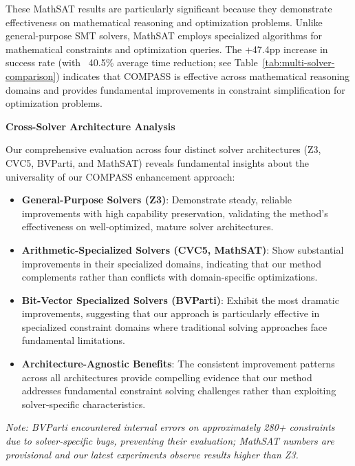 \documentclass[acmsmall,screen,review,anonymous]{acmart}
\newcommand{\tool}{\textsf{COMPASS}\xspace}
\begin{document}
These MathSAT results are particularly significant because they demonstrate effectiveness on mathematical reasoning and optimization problems. Unlike general-purpose SMT solvers, MathSAT employs specialized algorithms for mathematical constraints and optimization queries. The +47.4pp increase in success rate (with ~40.5\% average time reduction; see Table~\ref{tab:multi-solver-comparison}) indicates that \tool is effective across mathematical reasoning domains and provides fundamental improvements in constraint simplification for optimization problems.

\textbf{Cross-Solver Architecture Analysis}

Our comprehensive evaluation across four distinct solver architectures (Z3, CVC5, BVParti, and MathSAT) reveals fundamental insights about the universality of our \tool enhancement approach:

\begin{itemize}
    \item \textbf{General-Purpose Solvers (Z3)}: Demonstrate steady, reliable improvements with high capability preservation, validating the method's effectiveness on well-optimized, mature solver architectures.
    \item \textbf{Arithmetic-Specialized Solvers (CVC5, MathSAT)}: Show substantial improvements in their specialized domains, indicating that our method complements rather than conflicts with domain-specific optimizations.
    \item \textbf{Bit-Vector Specialized Solvers (BVParti)}: Exhibit the most dramatic improvements, suggesting that our approach is particularly effective in specialized constraint domains where traditional solving approaches face fundamental limitations.
    \item \textbf{Architecture-Agnostic Benefits}: The consistent improvement patterns across all architectures provide compelling evidence that our method addresses fundamental constraint solving challenges rather than exploiting solver-specific characteristics.
\end{itemize}

\textit{Note: BVParti encountered internal errors on approximately 280+ constraints due to solver-specific bugs, preventing their evaluation; MathSAT numbers are provisional and our latest experiments observe results higher than Z3.}
\end{document}
